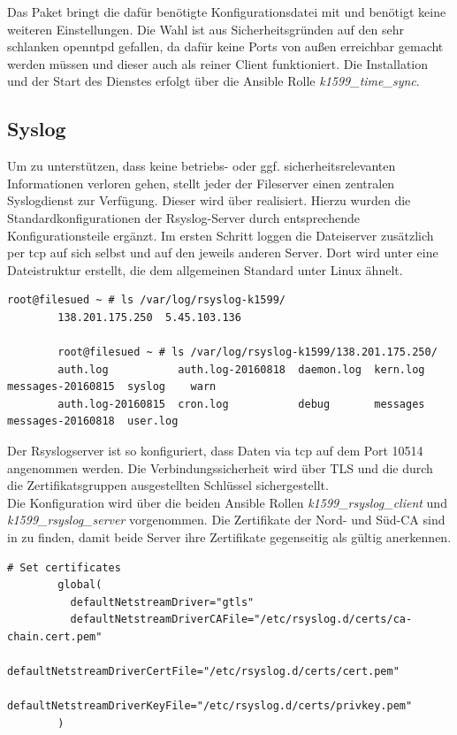 Das Paket  bringt die dafür benötigte Konfigurationsdatei mit und benötigt keine weiteren Einstellungen. Die Wahl ist aus Sicherheitsgründen auf den sehr schlanken openntpd gefallen, da dafür keine Ports von außen erreichbar gemacht werden müssen und dieser auch als reiner Client funktioniert. Die Installation und der Start des Dienstes erfolgt über die Ansible Rolle \textit{k1599\_time\_sync}.

\subsection{Syslog}
Um zu unterstützen, dass keine betriebs- oder ggf. sicherheitsrelevanten Informationen verloren gehen, stellt jeder der Fileserver einen zentralen Syslogdienst zur Verfügung. Dieser wird über  realisiert. Hierzu wurden die Standardkonfigurationen der Rsyslog-Server durch entsprechende Konfigurationsteile ergänzt. Im ersten Schritt loggen die Dateiserver zusätzlich per tcp auf sich selbst und auf den jeweils anderen Server. Dort wird unter  eine Dateistruktur erstellt, die dem allgemeinen Standard unter Linux ähnelt.

\begin{lstlisting}[label=code:syslog,caption=Syslog Dateien]
        root@filesued ~ # ls /var/log/rsyslog-k1599/
        138.201.175.250  5.45.103.136

        root@filesued ~ # ls /var/log/rsyslog-k1599/138.201.175.250/
        auth.log           auth.log-20160818  daemon.log  kern.log  messages-20160815  syslog    warn
        auth.log-20160815  cron.log           debug       messages  messages-20160818  user.log
\end{lstlisting}

Der Rsyslogserver ist so konfiguriert, dass Daten via tcp auf dem Port 10514
angenommen werden. Die Verbindungssicherheit wird über TLS und die durch die
Zertifikatsgruppen ausgestellten Schlüssel sichergestellt.\\

Die Konfiguration wird über die beiden Ansible Rollen \textit{k1599\_rsyslog\_client} und
\textit{k1599\_rsyslog\_server} vorgenommen. Die Zertifikate der Nord- und Süd-CA sind in  zu finden, damit beide Server ihre Zertifikate gegenseitig als gültig anerkennen.

\begin{lstlisting}[label=code:syslog2,caption=Auszug aus \_rsyslog\_server/templates/etc/rsyslog.d/30\_imtcp\_remote\_input.conf.j2]
        # Set certificates
        global(
          defaultNetstreamDriver="gtls"
          defaultNetstreamDriverCAFile="/etc/rsyslog.d/certs/ca-chain.cert.pem"
          defaultNetstreamDriverCertFile="/etc/rsyslog.d/certs/cert.pem"
          defaultNetstreamDriverKeyFile="/etc/rsyslog.d/certs/privkey.pem"
        )
\end{lstlisting}

